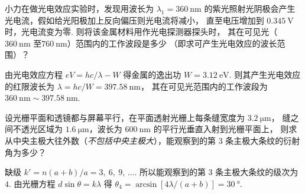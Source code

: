 \documentclass[quiet]{ctexart}
\begin{document}
\begin{problem}[本题6分]
  小力在做光电效应实验时，发现用波长为 $\lambda_1 = \qty{360}\nm$
  的紫光照射光阴极会产生光电流，假如给光阳极加上反向偏压则光电流将减小，
  直至电压增加到 $\qty{0.345}\V$ 时，光电流变为零. 则将该金属材料用作光电探测器探头时，
  其在可见光（$\qty{360}\nm$ 至$\qty{760}\nm$）范围内的工作波段是多少
  （即求可产生光电效应的波长范围）？
\end{problem}
\begin{solution}
  由光电效应方程 $eV = hc/\lambda - W$ 得金属的逸出功 $W = \qty{3.12}\eV$.
  则其产生光电效应的红限波长为 $\lambda = hc/W = \qty{397.58}\nm$，
  其在可见光范围内的工作波段为 $\qty{360}\nm \sim \qty{397.58}\nm$.
\end{solution}

\begin{problem}[本题5分]
  设光栅平面和透镜都与屏幕平行，在平面透射光栅上每条缝宽度为 $\qty{3.2}\um$，
  缝之间不透光区域为 $\qty{1.6}\um$，波长为 $\qty{600}\nm$ 的平行光垂直入射到光栅平面上，
  则求从中央主极大往外数（\emph{不包括中央主极大}），能观察到的第 3 条主极大条纹的衍射角为多少？
\end{problem}
\begin{solution}
  缺级 $k' = n(a + b)/a = 3,~ 6,~ 9,\, \ldots$. 所以能观察到的第 3 条主极大条纹的级次为 $4$.
  由光栅方程 $d\sin\theta = k\lambda$
  得 $\theta_4 = \arcsin[4\lambda/(a + b)] = \qty{30}\degree$.
\end{solution}
\end{document}
